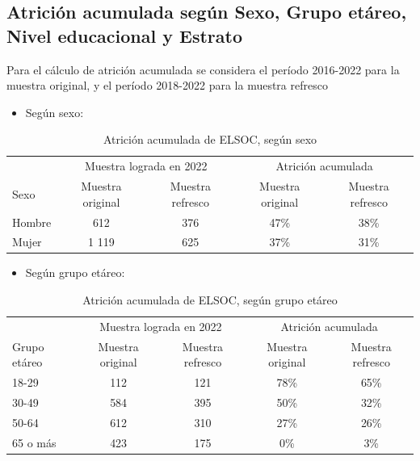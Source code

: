 \documentclass[
  12pt,
]{book}
\providecommand{\tightlist}{%
  \setlength{\itemsep}{0pt}\setlength{\parskip}{0pt}}
\begin{document}
\hypertarget{atriciuxf3n-acumulada-seguxfan-sexo-grupo-etuxe1reo-nivel-educacional-y-estrato}{%
\subsection*{Atrición acumulada según Sexo, Grupo etáreo, Nivel educacional y Estrato}\label{atriciuxf3n-acumulada-seguxfan-sexo-grupo-etuxe1reo-nivel-educacional-y-estrato}}

Para el cálculo de atrición acumulada se considera el período 2016-2022 para la muestra original, y el período 2018-2022 para la muestra refresco

\begin{itemize}
\tightlist
\item
  Según sexo:
\end{itemize}

\begin{table}

\caption{\label{tab:tabla-atricion-sexo}Atrición acumulada de ELSOC, según sexo}
\centering
\begin{tabular}[t]{l|c|c|c|c}
\hline
\multicolumn{1}{c|}{ } & \multicolumn{2}{c|}{Muestra lograda en 2022} & \multicolumn{2}{c}{Atrición acumulada} \\
\cline{2-3} \cline{4-5}
Sexo & Muestra original & Muestra refresco & Muestra original & Muestra refresco\\
\hline
Hombre & 612 & 376 & 47\% & 38\%\\
\hline
Mujer & 1 119 & 625 & 37\% & 31\%\\
\hline
\end{tabular}
\end{table}

\begin{itemize}
\tightlist
\item
  Según grupo etáreo:
\end{itemize}

\begin{table}

\caption{\label{tab:tabla-atricion-edad}Atrición acumulada de ELSOC, según grupo etáreo}
\centering
\begin{tabular}[t]{l|c|c|c|c}
\hline
\multicolumn{1}{c|}{ } & \multicolumn{2}{c|}{Muestra lograda en 2022} & \multicolumn{2}{c}{Atrición acumulada} \\
\cline{2-3} \cline{4-5}
Grupo etáreo & Muestra original & Muestra refresco & Muestra original & Muestra refresco\\
\hline
18-29 & 112 & 121 & 78\% & 65\%\\
\hline
30-49 & 584 & 395 & 50\% & 32\%\\
\hline
50-64 & 612 & 310 & 27\% & 26\%\\
\hline
65 o más & 423 & 175 & 0\% & 3\%\\
\hline
\end{tabular}
\end{table}
\end{document}

